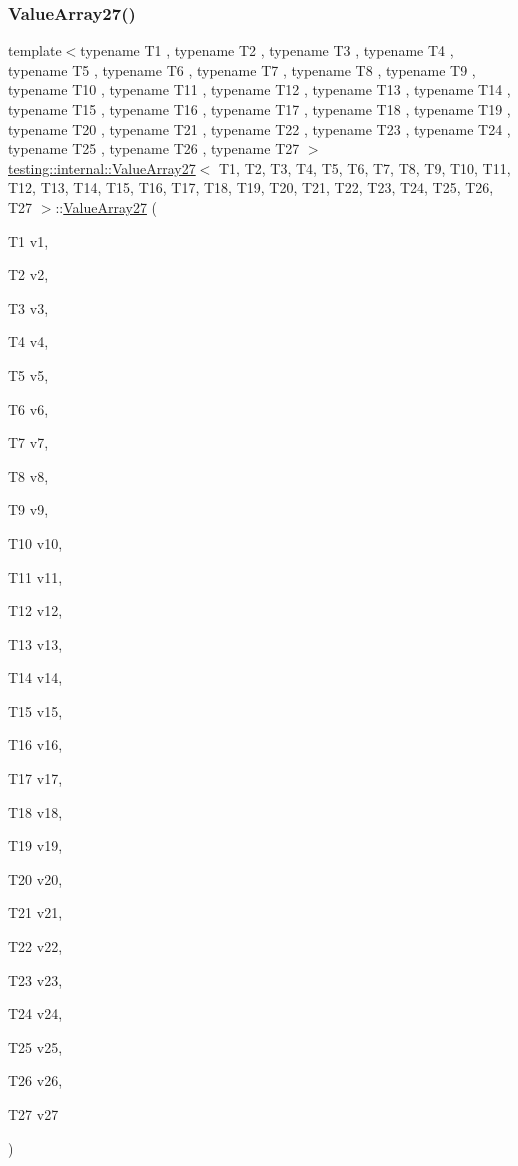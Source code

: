 \subsubsection{\texorpdfstring{ValueArray27()}{ValueArray27()}\hspace{0.1cm}{\footnotesize\ttfamily [1/2]}}
{\footnotesize\ttfamily template$<$typename T1 , typename T2 , typename T3 , typename T4 , typename T5 , typename T6 , typename T7 , typename T8 , typename T9 , typename T10 , typename T11 , typename T12 , typename T13 , typename T14 , typename T15 , typename T16 , typename T17 , typename T18 , typename T19 , typename T20 , typename T21 , typename T22 , typename T23 , typename T24 , typename T25 , typename T26 , typename T27 $>$ \\
\mbox{\hyperlink{classtesting_1_1internal_1_1ValueArray27}{testing\+::internal\+::\+Value\+Array27}}$<$ T1, T2, T3, T4, T5, T6, T7, T8, T9, T10, T11, T12, T13, T14, T15, T16, T17, T18, T19, T20, T21, T22, T23, T24, T25, T26, T27 $>$\+::\mbox{\hyperlink{classtesting_1_1internal_1_1ValueArray27}{Value\+Array27}} (\begin{DoxyParamCaption}\item[{T1}]{v1,  }\item[{T2}]{v2,  }\item[{T3}]{v3,  }\item[{T4}]{v4,  }\item[{T5}]{v5,  }\item[{T6}]{v6,  }\item[{T7}]{v7,  }\item[{T8}]{v8,  }\item[{T9}]{v9,  }\item[{T10}]{v10,  }\item[{T11}]{v11,  }\item[{T12}]{v12,  }\item[{T13}]{v13,  }\item[{T14}]{v14,  }\item[{T15}]{v15,  }\item[{T16}]{v16,  }\item[{T17}]{v17,  }\item[{T18}]{v18,  }\item[{T19}]{v19,  }\item[{T20}]{v20,  }\item[{T21}]{v21,  }\item[{T22}]{v22,  }\item[{T23}]{v23,  }\item[{T24}]{v24,  }\item[{T25}]{v25,  }\item[{T26}]{v26,  }\item[{T27}]{v27 }\end{DoxyParamCaption})\hspace{0.3cm}{\ttfamily [inline]}}

